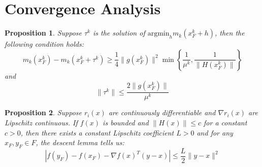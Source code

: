 \documentclass{article}
\newtheorem{proposition}{Proposition}
\begin{document}
	\section{Convergence Analysis}
	
	\begin{proposition}
		Suppose $\tau^k$ is the solution of $\text{argmin}_h m_k (x_F^k + h)$, then
		the following condition holds:
		\begin{equation}
			m_k (x^k_F) - m_k (x^k_F + \tau^k) \geq \frac{1}{4}  \| g (x_F^k)
			\|^2 \min \left\{ \frac{1}{\mu^k}, \frac{1}{\| H (x_F^k) \|} \right\}
		\end{equation}
		and
		\begin{equation}
			\| \tau^k \| \leq \frac{2 \| g (x_F^k) \|}{\mu^k}
		\end{equation}
	\end{proposition}
	
	\begin{proposition}
		Suppose $r_i (x)$ are continuously differentiable and $\nabla r_i (x)$ are
		Lipschitz continuous. If $f (x)$ is bounded and $\| H (x) \| \leq c$ for a
		constant $c > 0$, then there exists a constant Lipschitz coefficient $L > 0$
		and for any $x_F, y_F \in F$, the descent lemma tells us:
		\begin{equation}
			| f (y_F) - f (x_F) - \nabla f (x)^T  (y - x) | \leq \frac{L}{2} \| y
			- x \|^2
		\end{equation}
	\end{proposition}
	
\end{document}
